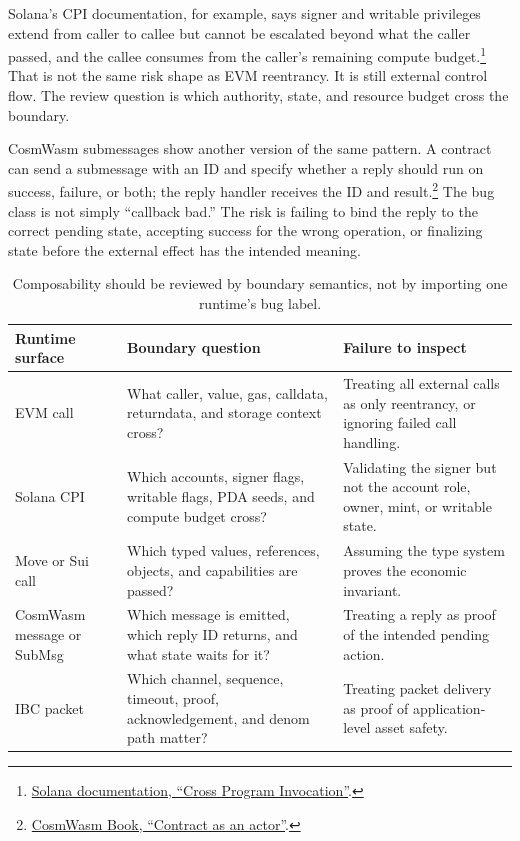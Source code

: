 Solana's CPI documentation, for example, says signer and writable privileges extend from caller to callee but cannot be escalated beyond what the caller passed, and the callee consumes from the caller's remaining compute budget.\footnote{\href{https://solana.com/docs/core/cpi}{Solana documentation, ``Cross Program Invocation''}.} That is not the same risk shape as EVM reentrancy. It is still external control flow. The review question is which authority, state, and resource budget cross the boundary.

CosmWasm submessages show another version of the same pattern. A contract can send a submessage with an ID and specify whether a reply should run on success, failure, or both; the reply handler receives the ID and result.\footnote{\href{https://book.cosmwasm.com/actor-model/contract-as-actor.html}{CosmWasm Book, ``Contract as an actor''}.} The bug class is not simply ``callback bad.'' The risk is failing to bind the reply to the correct pending state, accepting success for the wrong operation, or finalizing state before the external effect has the intended meaning.

\begin{table}[htbp]
\centering
\small
\renewcommand{\arraystretch}{1.18}
\begin{tabularx}{\textwidth}{@{}>{\RaggedRight\arraybackslash}p{}>{\RaggedRight\arraybackslash}p{}>{\RaggedRight\arraybackslash}X@{}}
\toprule
Runtime surface & Boundary question & Failure to inspect \\
\midrule
EVM call & What caller, value, gas, calldata, returndata, and storage context cross? & Treating all external calls as only reentrancy, or ignoring failed call handling. \\
Solana CPI & Which accounts, signer flags, writable flags, PDA seeds, and compute budget cross? & Validating the signer but not the account role, owner, mint, or writable state. \\
Move or Sui call & Which typed values, references, objects, and capabilities are passed? & Assuming the type system proves the economic invariant. \\
CosmWasm message or SubMsg & Which message is emitted, which reply ID returns, and what state waits for it? & Treating a reply as proof of the intended pending action. \\
IBC packet & Which channel, sequence, timeout, proof, acknowledgement, and denom path matter? & Treating packet delivery as proof of application-level asset safety. \\
\bottomrule
\end{tabularx}
\caption{Composability should be reviewed by boundary semantics, not by importing one runtime's bug label.}
\end{table}

